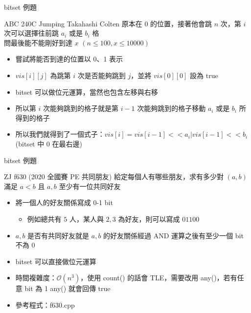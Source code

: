 \documentclass[aspectratio=169]{beamer}
\begin{document}
    \begin{frame}{bitset 例題}
        \begin{block}{ABC 240C Jumping Takahashi}
            Colten 原本在 0 的位置，接著他會跳 $n$ 次，第 $i$ 次可以選擇往前跳 $a_i$ 或是 $b_i$ 格\\
            問最後能不能剛好到達 $x$ $(n \le 100, x \le 10000)$
        \end{block}

        \begin{itemize}
            \item<2-> 嘗試將能否到達的位置以 0、1 表示
            \item<3-> $vis[i][j]$ 為跳第 $i$ 次是否能夠跳到 $j$，並將 $vis[0][0]$ 設為 true
            \item<4-> bitset 可以做位元運算，當然也包含左移與右移
            \item<5-> 所以第 $i$ 次能夠跳到的格子就是第 $i-1$ 次能夠跳到的格子移動 $a_i$ 或是 $b_i$ 所得到的格子
            \item<6-> 所以我們就得到了一個式子：$vis[i] = vis[i - 1] << a_i | vis[i - 1] << b_i$ (bitset 中 0 在最右邊)
        \end{itemize}
    \end{frame}

    \begin{frame}{bitset 例題}
        \begin{block}{ZJ f630 (2020 全國賽 PE 共同朋友)}
            給定每個人有哪些朋友，求有多少對 $(a, b)$ 滿足 $a<b$ 且 $a, b$ 至少有一位共同好友
        \end{block}

        \begin{itemize}
            \item<2-> 將一個人的好友關係寫成 0-1 bit
            \begin{itemize}
                \item<3-> 例如總共有 $5$ 人，某人與 ${2, 3}$ 為好友，則可以寫成 $01100$
            \end{itemize}
            \item<4-> $a, b$ 是否有共同好友就是 $a, b$ 的好友關係經過 AND 運算之後有至少一個 bit 不為 0
            \item<5-> bitset 可以直接做位元運算
            \item<6-> 時間複雜度：$\mathcal{O}(n^3)$，使用 count() 的話會 TLE，需要改用 any()，若有任意 bit 為 1 any() 就會回傳 true
            \item<6-> 參考程式：f630.cpp
        \end{itemize}
    \end{frame}
\end{document}
